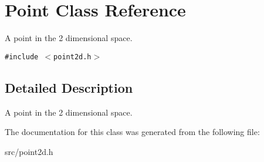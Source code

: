 \section{Point Class Reference}
\label{classPoint}
A point in the 2 dimensional space.  


{\tt \#include $<$point2d.h$>$}



\subsection{Detailed Description}
A point in the 2 dimensional space. 



The documentation for this class was generated from the following file:\begin{CompactItemize}
\item 
src/point2d.h\end{CompactItemize}
